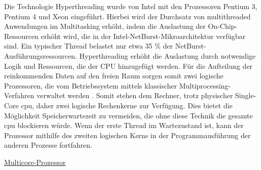 Die Technologie Hyperthreading wurde von Intel mit den Prozessoren Pentium 3, Pentium 4 und Xeon eingeführt. Hierbei wird der Durchsatz von multithreaded Anwendungen im Multitasking erhöht, indem die Auslastung der On-Chip-Ressourcen erhöht wird, die in der Intel-NetBurst-Mikroarchitektur verfügbar sind. Ein typischer Thread belastet nur etwa 35 \% der NetBurst-Ausführungsressourcen. Hyperthreading erhöht die Auslastung durch notwendige Logik und Ressourcen, die der CPU hinzugefügt werden. Für die Aufteilung der reinkommenden Daten auf den freien Raum sorgen somit zwei logische Prozessoren, die vom Betriebssystem mittels klassischer Multiprocessing-Verfahren verwaltet werden \cite[1138]{wolf2020}. Somit stehen dem Rechner, trotz physischer Single-Core \ac{cpu}, daher zwei logische Rechenkerne zur Verfügung. Dies bietet die Möglichkeit Speicherwartezeit zu vermeiden, die ohne diese Technik die gesamte \ac{cpu} blockieren würde. Wenn der erste Thread im Wartezustand ist, kann der Prozessor mithilfe des zweiten logischen Kerns in der Programmausführung  der anderen Prozesse fortfahren.

\underline{Multicore-Prozessor}

